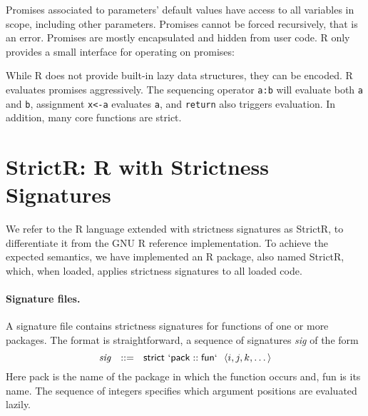 \documentclass[review,nonacm,screen,acmsmall,anonymous=true]{acmart}
\newcommand{\code}[1]{\lstinline |#1|\xspace}
\newcommand{\strictr}{{\sf StrictR}\xspace}
\begin{document}
\noindent
Promises associated to parameters' default values have access to all variables
in scope, including other parameters. Promises cannot be forced recursively,
that is an error. Promises are mostly encapsulated and hidden from user code. R
only provides a small interface for operating on promises:

\noindent
While R does not provide built-in lazy data structures, they can be encoded. R
evaluates promises aggressively. The sequencing operator \code{a:b} will
evaluate both \code a and \code b, assignment \code{x<-a} evaluates \code a, and
\code{return} also triggers evaluation. In addition, many core functions are
strict.

\newpage %
\section{StrictR: R with Strictness Signatures}\label{sec:strictr}

We refer to the R language extended with strictness signatures as \strictr, to
differentiate it from the GNU R reference implementation. To achieve the
expected semantics, we have implemented an R package, also named \strictr,
which, when loaded, applies strictness signatures to all loaded code.

\paragraph{Signature files.}
A signature file contains strictness signatures for functions of one or more
packages. The format is straightforward, a sequence of signatures \emph{sig} of
the form
%
\[
\mathit{sig}~~::=~~\mathsf{strict}~\mathsf{`pack}::\mathsf{fun`}~~\langle i, j, k, \dots\rangle
\]
%
Here {\sf pack} is the name of the package in which the function occurs and, {\sf
  fun} is its name. The sequence of integers specifies which argument positions
are evaluated lazily.
\end{document}
